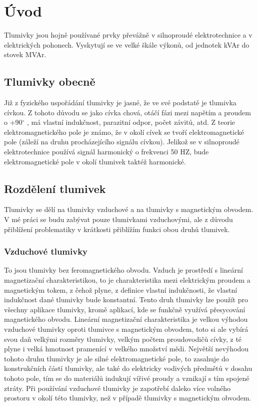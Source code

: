 \chapter{Úvod} \label{uvod}
Tlumivky jsou hojně používané prvky převážně v silnoproudé elektrotechnice a v elektrických pohonech. Vyskytují se ve velké škále výkonů, od jednotek kVAr do stovek MVAr. 
\section{Tlumivky obecně}
Již z fyzického uspořádání tlumivky je jasné, že ve své podstatě je tlumivka cívkou. Z tohoto důvodu se jako cívka chová, otáčí fázi mezi napětím a proudem o +90$^\circ$ , má vlastní indukčnost, parazitní odpor, počet závitů, atd. Z teorie elektromagnetického pole je známo, že v okolí cívek se tvoří elektromagnetické pole (záleží na druhu procházejícího signálu cívkou). Jelikož se v silnoproudé elektrotechnice používá signál harmonický o frekvenci 50 HZ, bude elektromagnetické pole v okolí tlumivek taktéž harmonické. 
\section{Rozdělení tlumivek}
Tlumivky se dělí na tlumivky vzduchové a na tlumivky s magnetickým obvodem. V mé práci se budu zabývat pouze tlumivkami vzduchovými, ale z důvodu přiblížení problematiky v krátkosti přiblížím funkci obou druhů tlumivek.
\subsection{Vzduchové tlumivky}
To jsou tlumivky bez feromagnetického obvodu. Vzduch je prostředí s lineární magnetizační charakteristikou, to je charakteristika mezi elektrickým proudem a magnetickým tokem, z čehož plyne, z definice vlastní indukčnosti, že vlastní indukčnost dané tlumivky bude konstantní. Tento druh tlumivky lze použít pro všechny aplikace tlumivky, kromě aplikací, kde se funkčně využívá přesycování magnetického obvodu. Lineární magnetizační charakteristika je velkou výhodou vzduchové tlumivky oproti tlumivce s magnetickým obvodem, toto si ale vybírá svou daň velkými rozměry tlumivky, velkým počtem proudovodičů cívky, z té plyne i velká hmotnost pramenící v velkého množství mědi. Největší nevýhodou tohoto druhu tlumivky je ale silné elektromagnetické pole, to zasahuje do konstrukčních částí tlumivky, ale také do elektricky vodivých předmětů v dosahu tohoto pole, tím se do materiálů indukují vířivé proudy a vznikají s tím spojené ztráty. Při používání vzduchové tlumivky je zapotřebí daleko více volného prostoru v okolí této tlumivky, než v případě tlumivky s magnetickým obvodem.   
